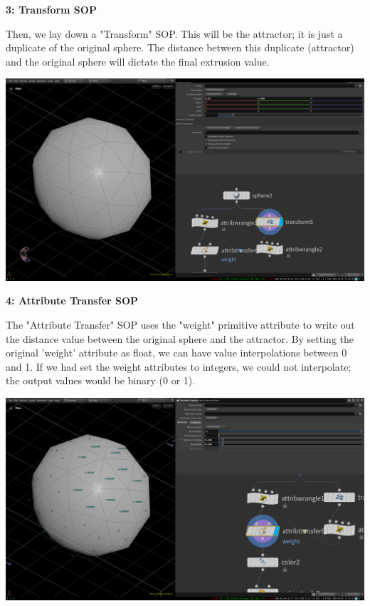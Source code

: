 \documentclass[11pt, a4paper]{article}
\begin{document}
\vspace{10pt}

\begin{minipage}[H]{0.4\textwidth}
	\textbf{3: Transform SOP}\newline 

Then, we lay down a "Transform" SOP. This will be the attractor; it is just a
duplicate of the original sphere. The distance between this duplicate
(attractor) and the original sphere will dictate the final extrusion value. 
	
\end{minipage}
\vspace{1pt}
\begin{minipage}[H]{0.6\textwidth}
	\includegraphics[width=1\textwidth]{media/houdini_fundamentals_3.png}
\end{minipage}


\begin{minipage}[H]{0.4\textwidth}
	\textbf{4: Attribute Transfer SOP}\newline 

The "Attribute Transfer" SOP uses the "weight" primitive attribute to write out
the distance value between the original sphere and the attractor. By setting
the original 'weight' attribute as float, we can have value interpolations
between 0 and 1. If we had set the weight attributes to integers, we could not
interpolate; the output values would be binary (0 or 1). 
 
\end{minipage}
\vspace{1pt}
\begin{minipage}[H]{0.6\textwidth}
	\includegraphics[width=1\textwidth]{media/houdini_fundamentals_4.png}
\end{minipage}
\end{document}
